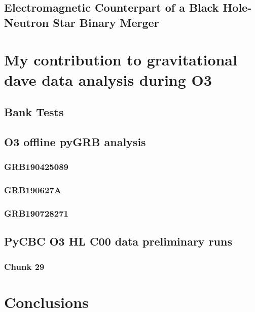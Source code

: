 \documentclass[binding=0.6cm, LaM]{sapthesis}
\begin{document}
\section{Electromagnetic Counterpart of a Black Hole-Neutron Star Binary Merger}


\chapter{My contribution to gravitational dave data analysis during O3}

\section{Bank Tests}

\section{O3 offline pyGRB analysis}

\subsection{GRB190425089}

\subsection{GRB190627A}

\subsection{GRB190728271}

\section{PyCBC O3 HL C00 data preliminary runs}

\subsection{Chunk 29}

\chapter{Conclusions}


\backmatter
\cleardoublepage


\begin{thebibliography}{100}
\end{thebibliography}
\end{document}
